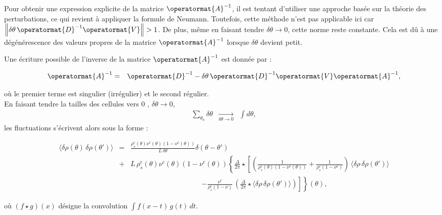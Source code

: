 Pour obtenir une expression explicite de la matrice $\operatormat{A}^{-1}$, il est tentant d'utiliser une approche basée sur la théorie des perturbations, ce qui revient à appliquer la formule de Neumann. Toutefois, cette méthode n'est pas applicable ici car $\left\| \delta\theta \, \operatormat{D}^{-1} \operatormat{V} \right\| > 1$.
De plus, même en faisant tendre $\delta\theta \to 0$, cette norme reste constante. Cela est dû à une dégénérescence des valeurs propres de la matrice $\operatormat{A}^{-1}$ lorsque $\delta\theta$ devient petit.

Une écriture possible de l'inverse de la matrice $\operatormat{A}^{-1}$ est donnée par :

\begin{eqnarray*}
    \operatormat{A}^{-1} &= &\operatormat{D}^{-1} - \delta\theta \,  \operatormat{D}^{-1}\operatormat{V} \operatormat{A}^{-1},
\end{eqnarray*}

où le premier terme est singulier (irrégulier) et le second régulier.\\

En faisant tendre la tailles des cellules vers 0 , \( \delta \theta \to 0 \), 
\begin{eqnarray*}
	\sum_{\theta_a} \delta \theta & \underset{\delta \theta \to 0 }{\rightarrow} & \int d\theta ,	
\end{eqnarray*}
les fluctuations s'écrivent alors sous la forme :


\begin{eqnarray*}
	\langle \delta \rho(\theta) \, \delta \rho(\theta') \rangle  &= & \frac{\rho^c_s(\theta) \nu^c(\theta)(1 - \nu^c(\theta))}{L \, \delta\theta} \delta ( \theta - \theta')		\\
	& + & L \, \rho^c_s(\theta) \nu^c(\theta)(1 - \nu^c(\theta)) \left \{  \frac{\Delta}{2\pi} \star  \left [ \left (  \frac{1}{\rho^c_s(\theta) (1 - \nu^c(\theta))} +  \frac{1}{\rho^c_s (1 - \nu^c)}\right )  \, \langle \delta \rho \, \delta \rho(\theta') \rangle  \right. \right .\\
	&&  ~~~~~~~~~~~~~~~~~~~~~~~~~~~~~~~~~~~~~~~~~~~~~\left . \left .   -  \frac{\nu^c}{\rho_s^c ( 1 - \nu )}  \, \left ( \frac{\Delta}{2\pi} \star \langle \delta \rho \, \delta \rho(\theta') \rangle   \right )  \right ] \right \} (\theta),
\end{eqnarray*}

où \( (f \star g)(x) \) désigne la convolution \( \int f(x - t)\, g(t)\, dt \).





